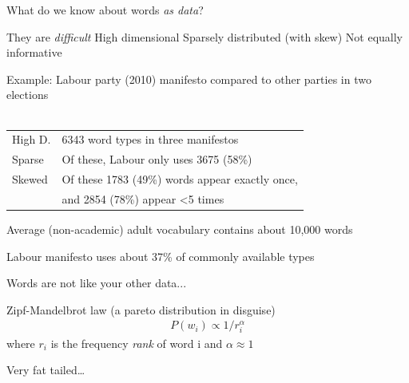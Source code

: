 \documentclass{mediumfoils}
\begin{document}

What do we know about words \textit{as data}? 

They are \textit{difficult}
\ita
\itm High dimensional 
\itm Sparsely distributed (with skew)
\itm Not equally informative
\itz



Example: Labour party (2010) manifesto compared to other parties in two elections\\
~\\
\begin{tabular}{ll}
High D. & 6343 word types in three manifestos \\
Sparse & Of these, Labour only uses 3675 (58\%)\\ 
Skewed &  Of these 1783 (49\%) words appear exactly once,\\
       &  and 2854 (78\%) appear <5 times
\end{tabular}

Average (non-academic) adult vocabulary contains about 10,000 words 

Labour manifesto uses about 37\% of commonly available types




Words are not like your other data... 

Zipf-Mandelbrot law (a pareto distribution in disguise) 
\begin{align*}
P(w_i) \propto 1/{r_i^\alpha}
\end{align*}
where $r_i$ is the frequency \textsl{rank} of word i and $\alpha\approx 1$

Very fat tailed\ldots

\end{document}
